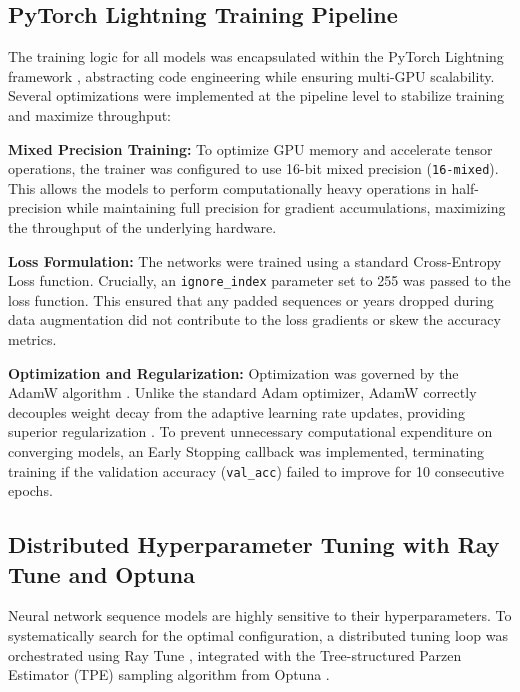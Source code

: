 \subsection{PyTorch Lightning Training Pipeline}
\label{subsec:lightning_pipeline}

The training logic for all models was encapsulated within the PyTorch Lightning framework \cite{falcon2019pytorch},
abstracting code engineering while ensuring multi-GPU scalability.
Several optimizations were implemented at the pipeline level to stabilize training and maximize throughput:

\textbf{Mixed Precision Training:}
To optimize GPU memory and accelerate tensor operations, the trainer was configured to use 16-bit mixed precision (\texttt{16-mixed}).
This allows the models to perform computationally heavy operations in half-precision while maintaining full precision for gradient accumulations,
maximizing the throughput of the underlying hardware.

\textbf{Loss Formulation:}
The networks were trained using a standard Cross-Entropy Loss function.
Crucially, an \texttt{ignore\_index} parameter set to 255 was passed to the loss function.
This ensured that any padded sequences or years dropped during data augmentation did not contribute to the loss gradients or skew the accuracy metrics.

\textbf{Optimization and Regularization:}
Optimization was governed by the AdamW algorithm \cite{loshchilov2017decoupled}.
Unlike the standard Adam optimizer, AdamW correctly decouples weight decay from the adaptive learning rate updates, providing superior regularization \cite{loshchilov2017decoupled}.
To prevent unnecessary computational expenditure on converging models, an Early Stopping callback was implemented,
terminating training if the validation accuracy (\texttt{val\_acc}) failed to improve for 10 consecutive epochs.

\subsection{Distributed Hyperparameter Tuning with Ray Tune and Optuna}
\label{subsec:ray_tune}

Neural network sequence models are highly sensitive to their hyperparameters. To systematically search for the optimal configuration,
a distributed tuning loop was orchestrated using Ray Tune \cite{liaw2018tune},
integrated with the Tree-structured Parzen Estimator (TPE) sampling algorithm from Optuna \cite{akiba2019optuna}.

